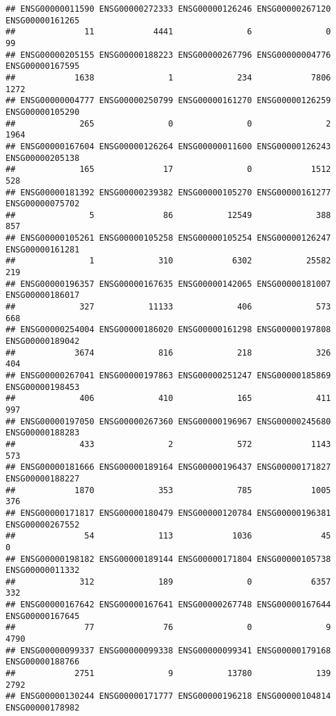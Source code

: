 \documentclass[
]{article}
\begin{document}
\begin{verbatim}
## ENSG00000011590 ENSG00000272333 ENSG00000126246 ENSG00000267120 ENSG00000161265 
##              11            4441               6               0              99 
## ENSG00000205155 ENSG00000188223 ENSG00000267796 ENSG00000004776 ENSG00000167595 
##            1638               1             234            7806            1272 
## ENSG00000004777 ENSG00000250799 ENSG00000161270 ENSG00000126259 ENSG00000105290 
##             265               0               0               2            1964 
## ENSG00000167604 ENSG00000126264 ENSG00000011600 ENSG00000126243 ENSG00000205138 
##             165              17               0            1512             528 
## ENSG00000181392 ENSG00000239382 ENSG00000105270 ENSG00000161277 ENSG00000075702 
##               5              86           12549             388             857 
## ENSG00000105261 ENSG00000105258 ENSG00000105254 ENSG00000126247 ENSG00000161281 
##               1             310            6302           25582             219 
## ENSG00000196357 ENSG00000167635 ENSG00000142065 ENSG00000181007 ENSG00000186017 
##             327           11133             406             573             668 
## ENSG00000254004 ENSG00000186020 ENSG00000161298 ENSG00000197808 ENSG00000189042 
##            3674             816             218             326             404 
## ENSG00000267041 ENSG00000197863 ENSG00000251247 ENSG00000185869 ENSG00000198453 
##             406             410             165             411             997 
## ENSG00000197050 ENSG00000267360 ENSG00000196967 ENSG00000245680 ENSG00000188283 
##             433               2             572            1143             573 
## ENSG00000181666 ENSG00000189164 ENSG00000196437 ENSG00000171827 ENSG00000188227 
##            1870             353             785            1005             376 
## ENSG00000171817 ENSG00000180479 ENSG00000120784 ENSG00000196381 ENSG00000267552 
##              54             113            1036              45               0 
## ENSG00000198182 ENSG00000189144 ENSG00000171804 ENSG00000105738 ENSG00000011332 
##             312             189               0            6357             332 
## ENSG00000167642 ENSG00000167641 ENSG00000267748 ENSG00000167644 ENSG00000167645 
##              77              76               0               9            4790 
## ENSG00000099337 ENSG00000099338 ENSG00000099341 ENSG00000179168 ENSG00000188766 
##            2751               9           13780             139            2792 
## ENSG00000130244 ENSG00000171777 ENSG00000196218 ENSG00000104814 ENSG00000178982 

\end{verbatim}
\end{document}
